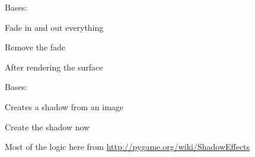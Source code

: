 \documentclass[letterpaper,10pt,english]{sphinxmanual}
\begin{document}
\begin{fulllineitems}
\label{blocks:serge.blocks.visualeffects.FadingScreen}
Bases: 

Fade in and out everything

\begin{fulllineitems}
\label{blocks:serge.blocks.visualeffects.FadingScreen.deleteFade}
Remove the fade

\end{fulllineitems}


\begin{fulllineitems}
\label{blocks:serge.blocks.visualeffects.FadingScreen.postRender}
After rendering the surface

\end{fulllineitems}


\end{fulllineitems}


\begin{fulllineitems}
\label{blocks:serge.blocks.visualeffects.Shadow}
Bases: {\hyperref[visual:serge.visual.SurfaceDrawing]{}}

Creates a shadow from an image

\begin{fulllineitems}
\label{blocks:serge.blocks.visualeffects.Shadow.createShadow}
Create the shadow now

Most of the logic here from \href{http://pygame.org/wiki/ShadowEffects}{http://pygame.org/wiki/ShadowEffects}

\end{fulllineitems}


\end{fulllineitems}

\end{document}
